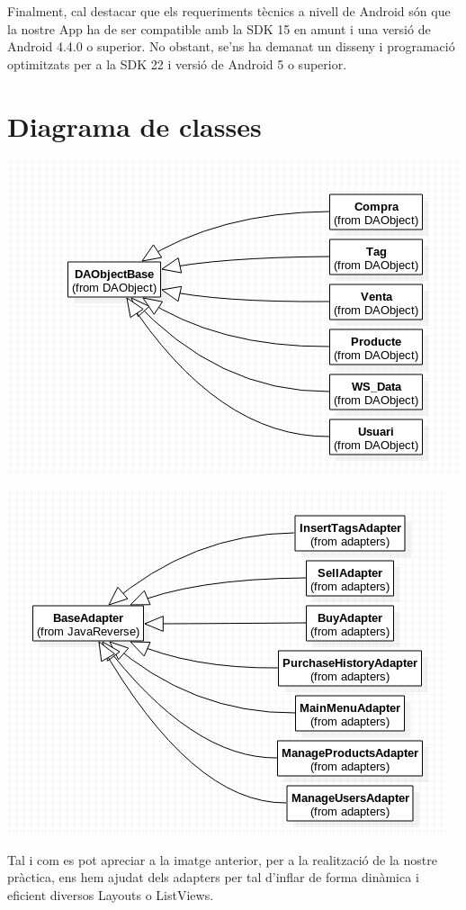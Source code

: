 \documentclass{article}
\begin{document}
Finalment, cal destacar que els requeriments tècnics a nivell de Android són que la nostre App ha de ser compatible amb la SDK 15 en amunt i una versió de Android 4.4.0 o superior. No obstant, se'ns ha demanat un disseny i programació optimitzats per a la SDK 22 i versió de Android 5 o superior.


\section{Diagrama de classes}

\begin{center}
	\includegraphics[scale=0.5]{img/1.png}
	 \end{center}

	\begin{center}
	\includegraphics[scale=0.5]{img/2.png}
	 \end{center}
	 	 Tal i com es pot apreciar a la imatge anterior, per a la realització de la nostre pràctica, ens hem ajudat dels adapters per tal d'inflar de forma dinàmica i eficient diversos Layouts o ListViews.\\
	
\end{document}
